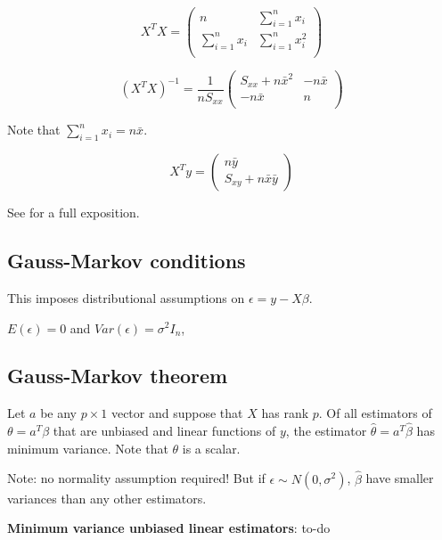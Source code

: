 \begin{equation}
X^T X = \begin{pmatrix}
n & \sum_{i=1}^n x_i\\
\sum_{i=1}^n x_i & \sum_{i=1}^n x_i^2\\
\end{pmatrix}
\end{equation}

\begin{equation}
(X^T X)^{-1} = \frac{1}{nS_{xx}} 
\begin{pmatrix}
 S_{xx}+n\bar{x}^2 & -n\bar{x} \\
 -n\bar{x} & n\\
\end{pmatrix}
\end{equation}

\noindent
Note that $\sum_{i=1}^n x_i = n\bar{x}$.

\begin{equation}
X^T  y = \begin{pmatrix}
n\bar{y} \\
S_{xy} + n\bar{x}\bar{y}
\end{pmatrix}
\end{equation}


See \cite[25]{DraperSmith} for a full exposition.

\subsection{Gauss-Markov conditions}

This imposes distributional assumptions on $\epsilon = y - X \beta$.

$E(\epsilon)=0$ and $Var(\epsilon)=\sigma^2 I_n$,

\subsection{Gauss-Markov theorem}

Let $a$ be any $p \times 1$ vector and suppose that $X$ has rank $p$. Of all estimators of $\theta = a^T \beta$ that are unbiased and linear functions of $y$, the estimator $\hat{\theta} = a^T \hat{\beta}$ has minimum variance. Note that $\theta$ is a scalar.

Note: no normality assumption required! But if $\epsilon \sim N(0,\sigma^2)$, $\hat{\beta}$ have smaller variances than any other estimators.

\textbf{Minimum variance unbiased linear estimators}:
to-do

